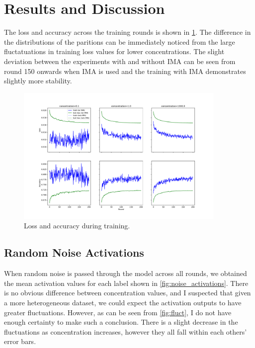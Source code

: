 \documentclass{article}
\begin{document}
\section{Results and Discussion}
The loss and accuracy across the training rounds is shown in \cref{fig:training_loss_acc}. The difference in the distributions of the paritions can be immediately noticed from the large fluctatuations in training loss values for lower concentrations. The slight deviation between the experiments with and without IMA can be seen from round 150 onwards when IMA is used and the training with IMA demonstrates slightly more stability.

\begin{figure}
  \centering
  \includegraphics[width=0.9\textwidth]{images/training_hist.pdf}
  \caption{Loss and accuracy during training.}
  \label{fig:training_loss_acc}
\end{figure}

\subsection{Random Noise Activations}
When random noise is passed through the model across all rounds, we obtained the mean activation values for each label shown in \cref{fig:noise_activations}. There is no obvious difference between concentration values, and I suspected that given a more heterogeneous dataset, we could expect the activation outputs to have greater fluctuations. However, as can be seen from \cref{fig:fluct}, I do not have enough certainty to make such a conclusion. There is a slight decrease in the fluctuations as concentration increases, however they all fall within each others' error bars.
\end{document}
